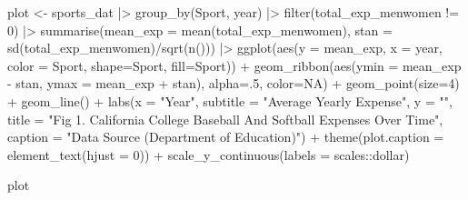\documentclass[
  letterpaper,
  DIV=11,
  numbers=noendperiod]{scrartcl}
\newenvironment{Shaded}{\begin{snugshade}}{\end{snugshade}}
\newcommand{\AttributeTok}[1]{\textcolor[rgb]{0.40,0.45,0.13}{#1}}
\newcommand{\ConstantTok}[1]{\textcolor[rgb]{0.56,0.35,0.01}{#1}}
\newcommand{\DecValTok}[1]{\textcolor[rgb]{0.68,0.00,0.00}{#1}}
\newcommand{\FunctionTok}[1]{\textcolor[rgb]{0.28,0.35,0.67}{#1}}
\newcommand{\NormalTok}[1]{\textcolor[rgb]{0.00,0.23,0.31}{#1}}
\newcommand{\OtherTok}[1]{\textcolor[rgb]{0.00,0.23,0.31}{#1}}
\newcommand{\SpecialCharTok}[1]{\textcolor[rgb]{0.37,0.37,0.37}{#1}}
\newcommand{\StringTok}[1]{\textcolor[rgb]{0.13,0.47,0.30}{#1}}
\begin{document}
\begin{Shaded}
\begin{Highlighting}[]
\NormalTok{plot }\OtherTok{\textless{}{-}}\NormalTok{ sports\_dat }\SpecialCharTok{|\textgreater{}}
  \FunctionTok{group\_by}\NormalTok{(Sport, year) }\SpecialCharTok{|\textgreater{}}
  \FunctionTok{filter}\NormalTok{(total\_exp\_menwomen }\SpecialCharTok{!=} \DecValTok{0}\NormalTok{) }\SpecialCharTok{|\textgreater{}}
  \FunctionTok{summarise}\NormalTok{(}\AttributeTok{mean\_exp =} \FunctionTok{mean}\NormalTok{(total\_exp\_menwomen), }\AttributeTok{stan =} \FunctionTok{sd}\NormalTok{(total\_exp\_menwomen)}\SpecialCharTok{/}\FunctionTok{sqrt}\NormalTok{(}\FunctionTok{n}\NormalTok{())) }\SpecialCharTok{|\textgreater{}}
  \FunctionTok{ggplot}\NormalTok{(}\FunctionTok{aes}\NormalTok{(}\AttributeTok{y =}\NormalTok{ mean\_exp, }\AttributeTok{x =}\NormalTok{ year, }\AttributeTok{color =}\NormalTok{ Sport, }\AttributeTok{shape=}\NormalTok{Sport, }\AttributeTok{fill=}\NormalTok{Sport)) }\SpecialCharTok{+}
   \FunctionTok{geom\_ribbon}\NormalTok{(}\FunctionTok{aes}\NormalTok{(}\AttributeTok{ymin =}\NormalTok{ mean\_exp }\SpecialCharTok{{-}}\NormalTok{ stan, }\AttributeTok{ymax =}\NormalTok{ mean\_exp }\SpecialCharTok{+}\NormalTok{ stan), }\AttributeTok{alpha=}\NormalTok{.}\DecValTok{5}\NormalTok{, }\AttributeTok{color=}\ConstantTok{NA}\NormalTok{) }\SpecialCharTok{+}
  \FunctionTok{geom\_point}\NormalTok{(}\AttributeTok{size=}\DecValTok{4}\NormalTok{) }\SpecialCharTok{+}
  \FunctionTok{geom\_line}\NormalTok{() }\SpecialCharTok{+}
  \FunctionTok{labs}\NormalTok{(}\AttributeTok{x =} \StringTok{"Year"}\NormalTok{, }\AttributeTok{subtitle =} \StringTok{"Average Yearly Expense"}\NormalTok{, }\AttributeTok{y =} \StringTok{""}\NormalTok{, }\AttributeTok{title =} \StringTok{"Fig 1. California College Baseball And Softball Expenses Over Time"}\NormalTok{, }\AttributeTok{caption =} \StringTok{"Data Source (Department of Education)"}\NormalTok{) }\SpecialCharTok{+}
\FunctionTok{theme}\NormalTok{(}\AttributeTok{plot.caption =} \FunctionTok{element\_text}\NormalTok{(}\AttributeTok{hjust =} \DecValTok{0}\NormalTok{)) }\SpecialCharTok{+} 
\FunctionTok{scale\_y\_continuous}\NormalTok{(}\AttributeTok{labels =}\NormalTok{ scales}\SpecialCharTok{::}\NormalTok{dollar)}

\NormalTok{plot}
\end{Highlighting}
\end{Shaded}
\end{document}
